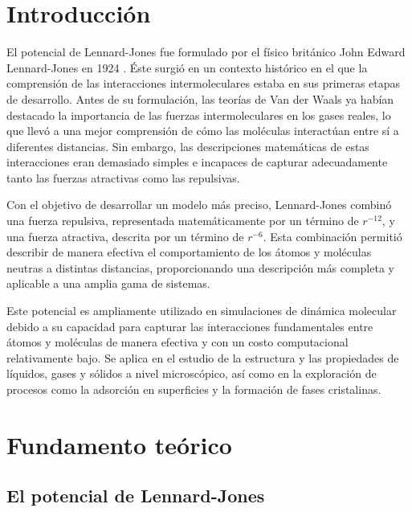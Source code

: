 \section{Introducción}

El potencial de Lennard-Jones fue formulado por el físico británico John Edward Lennard-Jones en 1924 \cite{Jones1924}. Éste surgió en un contexto histórico en el que la comprensión de las interacciones intermoleculares estaba en sus primeras etapas de desarrollo. Antes de su formulación, las teorías de Van der Waals ya habían destacado la importancia de las fuerzas intermoleculares en los gases reales, lo que llevó a una mejor comprensión de cómo las moléculas interactúan entre sí a diferentes distancias. Sin embargo, las descripciones matemáticas de estas interacciones eran demasiado simples e incapaces de capturar adecuadamente tanto las fuerzas atractivas como las repulsivas.

\vspace{\baselineskip}

Con el objetivo de desarrollar un modelo más preciso, Lennard-Jones combinó una fuerza repulsiva, representada matemáticamente por un término de \( r^{-12} \), y una fuerza atractiva, descrita por un término de \( r^{-6} \). Esta combinación permitió describir de manera efectiva el comportamiento de los átomos y moléculas neutras a distintas distancias, proporcionando una descripción más completa y aplicable a una amplia gama de sistemas. 

\vspace{\baselineskip}

Este potencial es ampliamente utilizado en simulaciones de dinámica molecular debido a su capacidad para capturar las interacciones fundamentales entre átomos y moléculas de manera efectiva y con un costo computacional relativamente bajo. Se aplica en el estudio de la estructura y las propiedades de líquidos, gases y sólidos a nivel microscópico, así como en la exploración de procesos como la adsorción en superficies y la formación de fases cristalinas.



\section{Fundamento teórico}
\subsection{El potencial de Lennard-Jones}

